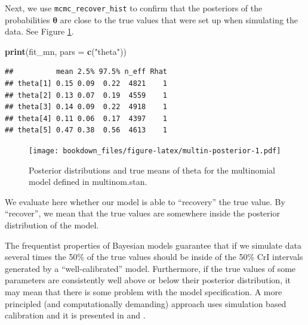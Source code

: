 \documentclass[12pt,]{krantz}
\newenvironment{Shaded}{\begin{snugshade}}{\end{snugshade}}
\newcommand{\DataTypeTok}[1]{\textcolor[rgb]{0.13,0.29,0.53}{#1}}
\newcommand{\DecValTok}[1]{\textcolor[rgb]{0.00,0.00,0.81}{#1}}
\newcommand{\KeywordTok}[1]{\textcolor[rgb]{0.13,0.29,0.53}{\textbf{#1}}}
\newcommand{\NormalTok}[1]{#1}
\newcommand{\OperatorTok}[1]{\textcolor[rgb]{0.81,0.36,0.00}{\textbf{#1}}}
\newcommand{\StringTok}[1]{\textcolor[rgb]{0.31,0.60,0.02}{#1}}
\theoremstyle{definition}
\theoremstyle{definition}
\theoremstyle{definition}
\theoremstyle{remark}
\begin{document}
Next, we use \texttt{mcmc\_recover\_hist} to confirm that the posteriors of the probabilities \(\boldsymbol{\theta}\) are close to the true values that were set up when simulating the data. See Figure \ref{fig:multin-posterior}.

\begin{Shaded}
\begin{Highlighting}[]
\KeywordTok{print}\NormalTok{(fit_mn, }\DataTypeTok{pars =} \KeywordTok{c}\NormalTok{(}\StringTok{"theta"}\NormalTok{))}
\end{Highlighting}
\end{Shaded}

\begin{verbatim}
##          mean 2.5% 97.5% n_eff Rhat
## theta[1] 0.15 0.09  0.22  4821    1
## theta[2] 0.13 0.07  0.19  4559    1
## theta[3] 0.14 0.09  0.22  4918    1
## theta[4] 0.11 0.06  0.17  4397    1
## theta[5] 0.47 0.38  0.56  4613    1
\end{verbatim}

\begin{Shaded}
\end{Shaded}

\begin{figure}
\centering
\texttt{[image: bookdown\_files/figure-latex/multin-posterior-1.pdf]}
\caption{\label{fig:multin-posterior}Posterior distributions and true means of theta for the multinomial model defined in multinom.stan.}
\end{figure}

We evaluate here whether our model is able to ``recovery'' the true value. By ``recover'', we mean that the true values are somewhere inside the posterior distribution of the model.

The frequentist properties of Bayesian models guarantee that if we simulate data several times the 50\% of the true values should be inside of the 50\% CrI intervals generated by a ``well-calibrated'' model. Furthermore, if the true values of some parameters are consistently well above or below their posterior distribution, it may mean that there is some problem with the model specification. A more principled (and computationally demanding) approach uses simulation based calibration and it is presented in \citet{talts2018validating} and \citet{schad2020toward}.
\end{document}

